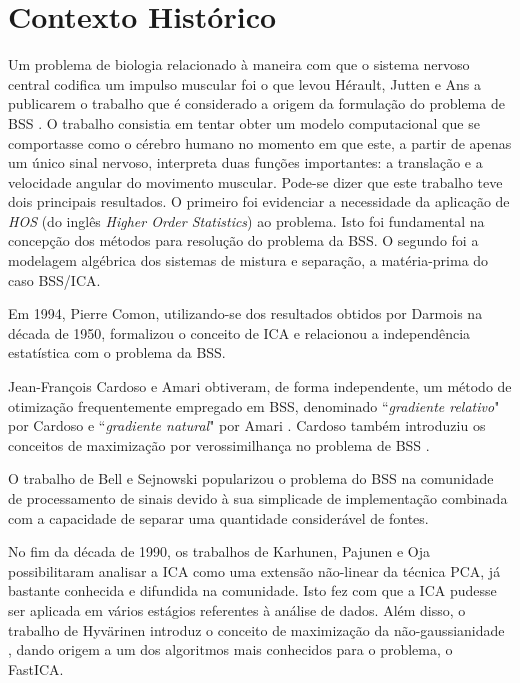 \label{chap:2}

\section{Contexto Histórico}

    Um problema de biologia relacionado à maneira com que o sistema nervoso central codifica um impulso muscular foi o que levou Hérault, Jutten e Ans a publicarem o trabalho que é considerado a origem da formulação do problema de BSS \cite{french}. O trabalho consistia em tentar obter um modelo computacional que se comportasse como o cérebro humano no momento em que este, a partir de apenas um único sinal nervoso, interpreta duas funções importantes: a translação e a velocidade angular do movimento muscular. Pode-se dizer que este trabalho teve dois principais resultados. O primeiro foi evidenciar a necessidade da aplicação de \textit{HOS} (do inglês \textit{Higher Order Statistics}) ao problema. Isto foi fundamental na concepção dos métodos para resolução do problema da BSS. O segundo foi a modelagem algébrica dos sistemas de mistura e separação, a matéria-prima do caso BSS/ICA.


    Em 1994, Pierre Comon, utilizando-se dos resultados obtidos por Darmois na década de 1950, formalizou o conceito de ICA e relacionou a independência estatística com o problema da BSS. \cite{Comon}
    
    
    Jean-François Cardoso e Amari obtiveram, de forma independente, um método de otimização frequentemente empregado em BSS, denominado ``\textit{gradiente relativo}" por Cardoso \cite{easi} e ``\textit{gradiente natural}" por Amari \cite{Riemenn}. Cardoso também introduziu os conceitos de maximização por verossimilhança no problema de BSS \cite{ICA3}.
    
    
    O trabalho de Bell e Sejnowski \cite{ICAML} popularizou o problema do BSS na comunidade de processamento de sinais devido à sua simplicade de implementação combinada com a capacidade de separar uma quantidade considerável de fontes.
    
    No fim da década de 1990, os trabalhos de Karhunen, Pajunen e Oja \cite{ICA} possibilitaram analisar a ICA como uma extensão não-linear da técnica PCA, já bastante conhecida e difundida na comunidade. Isto fez com que a ICA pudesse ser aplicada em vários estágios referentes à análise de dados. Além disso,  o trabalho de  Hyvärinen introduz o conceito de maximização da não-gaussianidade \cite{ICAML}, dando origem a um dos algoritmos mais conhecidos para o problema, o FastICA.
    
